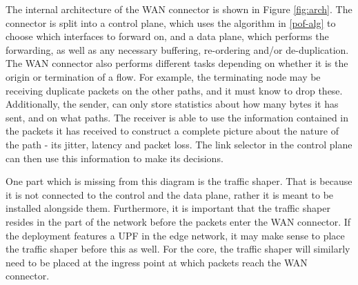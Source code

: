 The internal architecture of the WAN connector is shown in Figure \ref{fig:arch}. The connector is split into a control plane, which uses the algorithm in \ref{pof-alg} to choose which interfaces to forward on, and a data plane, which performs the forwarding, as well as any necessary buffering, re-ordering and/or de-duplication. The WAN connector also performs different tasks depending on whether it is the origin or termination of a flow. For example, the terminating node may be receiving duplicate packets on the other paths, and it must know to drop these. Additionally, the sender, can only store statistics about how many bytes it has sent, and on what paths. The receiver is able to use the information contained in the packets it has received to construct a complete picture about the nature of the path - its jitter, latency and packet loss. The link selector in the control plane can then use this information to make its decisions.

One part which is missing from this diagram is the traffic shaper. That is because it is not connected to the control and the data plane, rather it is meant to be installed alongside them. Furthermore, it is important that the traffic shaper resides in the part of the network before the packets enter the WAN connector. If the deployment features a UPF in the edge network, it may make sense to place the traffic shaper before this as well. For the core, the traffic shaper will similarly need to be placed at the ingress point at which packets reach the WAN connector.






























